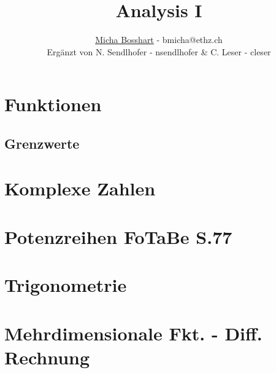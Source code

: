 \documentclass[8pt]{mpscheatsheet}
\author{\href{https://n.ethz.ch/\~bmicha}{Micha Bosshart} - bmicha@ethz.ch\\\footnotesize Ergänzt von N. Sendlhofer - nsendlhofer \& C. Leser - cleser}
\title{Analysis I}
\begin{document}
    \section{Funktionen}
        
        \subsection{Grenzwerte}
        
        
        
        
        
    \section{Komplexe Zahlen}
        
        
        
    \section{Potenzreihen \texorpdfstring{\hfill FoTaBe S.77}{ - FoTaBe S.77}}
        
        
        

        \newpage
    \section{Trigonometrie}
        
        
        
    \section{Mehrdimensionale Fkt. - Diff. Rechnung}
        
        
        
        
        
        
        
         
         
\end{document}
